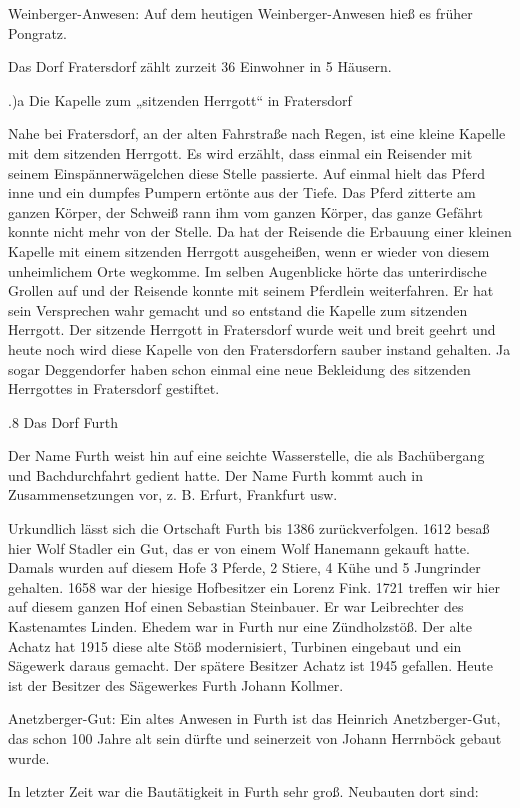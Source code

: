Weinberger-Anwesen: Auf dem heutigen Weinberger-Anwesen hieß es früher Pongratz.

Das Dorf Fratersdorf zählt zurzeit 36 Einwohner in 5 Häusern.

.)a Die Kapelle zum „sitzenden Herrgott“ in Fratersdorf

Nahe bei Fratersdorf, an der alten Fahrstraße nach Regen, ist eine kleine
Kapelle mit dem sitzenden Herrgott. Es wird erzählt, dass einmal ein Reisender
mit seinem Einspännerwägelchen diese Stelle passierte. Auf einmal hielt das
Pferd inne und ein dumpfes Pumpern ertönte aus der Tiefe. Das Pferd zitterte am
ganzen Körper, der Schweiß rann ihm vom ganzen Körper, das ganze Gefährt konnte
nicht mehr von der Stelle. Da hat der Reisende die Erbauung einer kleinen
Kapelle mit einem sitzenden Herrgott ausgeheißen, wenn er wieder von diesem
unheimlichem Orte wegkomme. Im selben Augenblicke hörte das unterirdische
Grollen auf und der Reisende konnte mit seinem Pferdlein weiterfahren. Er hat
sein Versprechen wahr gemacht und so entstand die Kapelle zum sitzenden
Herrgott. Der sitzende Herrgott in Fratersdorf wurde weit und breit geehrt und
heute noch wird diese Kapelle von den Fratersdorfern sauber instand gehalten. Ja
sogar Deggendorfer haben schon einmal eine neue Bekleidung des sitzenden
Herrgottes in Fratersdorf gestiftet.

.8 Das Dorf Furth

Der Name Furth weist hin auf eine seichte Wasserstelle, die als Bachübergang und
Bachdurchfahrt gedient hatte. Der Name Furth kommt auch in Zusammensetzungen
vor, z. B. Erfurt, Frankfurt usw.

Urkundlich lässt sich die Ortschaft Furth bis 1386 zurückverfolgen. 1612 besaß
hier Wolf Stadler ein Gut, das er von einem Wolf Hanemann gekauft hatte. Damals
wurden auf diesem Hofe 3 Pferde, 2 Stiere, 4 Kühe und 5 Jungrinder gehalten.
1658 war der hiesige Hofbesitzer ein Lorenz Fink. 1721 treffen wir hier auf
diesem ganzen Hof einen Sebastian Steinbauer. Er war Leibrechter des Kastenamtes
Linden. Ehedem war in Furth nur eine Zündholzstöß. Der alte Achatz hat 1915
diese alte Stöß modernisiert, Turbinen eingebaut und ein Sägewerk daraus
gemacht. Der spätere Besitzer Achatz ist 1945 gefallen. Heute ist der Besitzer
des Sägewerkes Furth Johann Kollmer.

Anetzberger-Gut: Ein altes Anwesen in Furth ist das Heinrich Anetzberger-Gut,
das schon 100 Jahre alt sein dürfte und seinerzeit von Johann Herrnböck gebaut
wurde.

In letzter Zeit war die Bautätigkeit in Furth sehr groß. Neubauten dort sind:



